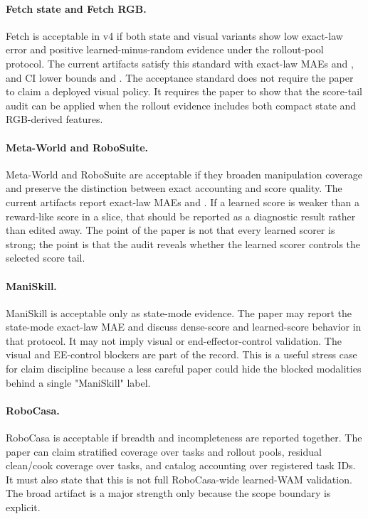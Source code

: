 \paragraph{Fetch state and Fetch RGB.}
Fetch is acceptable in v4 if both state and visual variants show low exact-law
error and positive learned-minus-random evidence under the rollout-pool
protocol. The current artifacts satisfy this standard with exact-law MAEs
\VFourWAMFetchExactMAE{} and \VFourWAMFetchRGBExactMAE{}, and CI lower
bounds \VFourWAMFetchCILo{} and \VFourWAMFetchRGBCILo{}. The acceptance
standard does not require the paper to claim a deployed visual policy. It
requires the paper to show that the score-tail audit can be applied when the
rollout evidence includes both compact state and RGB-derived features.

\paragraph{Meta-World and RoboSuite.}
Meta-World and RoboSuite are acceptable if they broaden manipulation coverage
and preserve the distinction between exact accounting and score quality. The
current artifacts report exact-law MAEs \VFourWAMMetaWorldExactMAE{} and
\VFourWAMRoboSuiteExactMAE{}. If a learned score is weaker than a reward-like
score in a slice, that should be reported as a diagnostic result rather than
edited away. The point of the paper is not that every learned scorer is strong;
the point is that the audit reveals whether the learned scorer controls the
selected score tail.

\paragraph{ManiSkill.}
ManiSkill is acceptable only as state-mode evidence. The paper may report the
state-mode exact-law MAE \VFourWAMManiSkillExactMAE{} and discuss dense-score
and learned-score behavior in that protocol. It may not imply visual or
end-effector-control validation. The visual and EE-control blockers are part
of the record. This is a useful stress case for claim discipline because a
less careful paper could hide the blocked modalities behind a single
"ManiSkill" label.

\paragraph{RoboCasa.}
RoboCasa is acceptable if breadth and incompleteness are reported together.
The paper can claim stratified coverage over \VFourWAMRoboCasaTasks{} tasks
and \VFourWAMRoboCasaPools{} rollout pools, residual clean/cook coverage over
\VFourWAMRoboCasaResidualTasks{} tasks, and catalog accounting over
\VFourWAMRoboCasaRegistered{} registered task IDs. It must also state that
this is not full RoboCasa-wide learned-WAM validation. The broad artifact is a
major strength only because the scope boundary is explicit.

